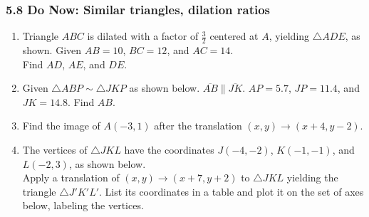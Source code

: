 \documentclass[12pt, twoside]{article}
\begin{document}
\subsubsection*{5.8 Do Now: Similar triangles, dilation ratios}
 \begin{enumerate}

  \item Triangle $ABC$ is dilated with a factor of $\frac{3}{2}$ centered at $A$, yielding $\triangle ADE$, as shown. Given $AB=10$, $BC=12$, and $AC=14$. \\[0.25cm] Find $AD$, $AE$, and $DE$.
    \begin{flushright}
      \end{flushright}

   \vspace{2cm}

   \item Given $\triangle ABP \sim \triangle JKP$ as shown below. $\overline{AB} \parallel \overline{JK}$. $AP=5.7$, $JP=11.4$, and $JK=14.8$. Find $AB$.
    \begin{flushright}
       \end{flushright}
       \vspace{2cm}

    \item Find the image of $A(-3,1)$ after the translation $(x,y) \rightarrow (x+4,y-2)$.
  
  

   \newpage

    \item The vertices of $\triangle JKL$ have the coordinates $J(-4,-2)$, $K(-1,-1)$, and $L(-2,3)$, as shown below. \\[0.5cm]
    Apply a translation of $(x,y) \rightarrow (x+7, y+2)$ to $\triangle JKL$  yielding the triangle $\triangle J'K'L'$. List its coordinates in a table and plot it on the set of axes below, labeling the vertices.
    \begin{flushright}
\end{flushright}
\end{enumerate}
\end{document}
